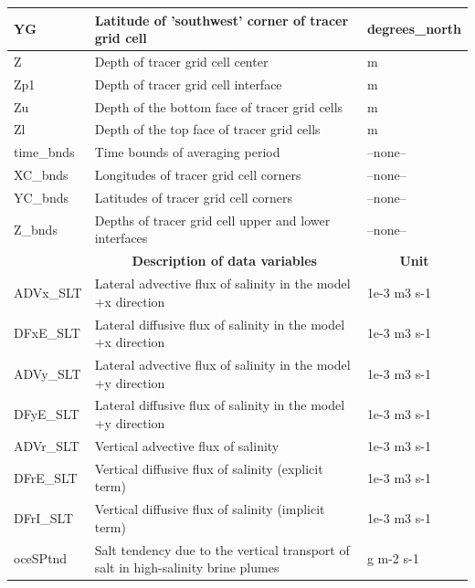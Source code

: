 \begin{longtable}{|m{}|m{}|m{}|}
YG &Latitude of 'southwest' corner of tracer grid cell &degrees\_north  \\ \hline
Z &Depth of tracer grid cell center &m  \\ \hline
Zp1 &Depth of tracer grid cell interface &m  \\ \hline
Zu &Depth of the bottom face of tracer grid cells &m  \\ \hline
Zl &Depth of the top face of tracer grid cells &m  \\ \hline
time\_bnds &Time bounds of averaging period &--none--  \\ \hline
XC\_bnds &Longitudes of tracer grid cell corners &--none--  \\ \hline
YC\_bnds &Latitudes of tracer grid cell corners &--none--  \\ \hline
Z\_bnds &Depths of tracer grid cell upper and lower interfaces &--none--  \\ \hline
\rowcolor{lightgray} \multicolumn{1}{|c|}{\textbf{Variables}} & \multicolumn{1}{|c|}{\textbf{Description of data variables}} &  \multicolumn{1}{|c|}{\textbf{Unit}}\\ \hline
ADVx\_SLT &Lateral advective flux of salinity in the model +x direction &1e-3 m3 s-1  \\ \hline
DFxE\_SLT &Lateral diffusive flux of salinity in the model +x direction &1e-3 m3 s-1  \\ \hline
ADVy\_SLT &Lateral advective flux of salinity in the model +y direction &1e-3 m3 s-1  \\ \hline
DFyE\_SLT &Lateral diffusive flux of salinity in the model +y direction &1e-3 m3 s-1  \\ \hline
ADVr\_SLT &Vertical advective flux of salinity &1e-3 m3 s-1  \\ \hline
DFrE\_SLT &Vertical diffusive flux of salinity (explicit term) &1e-3 m3 s-1  \\ \hline
DFrI\_SLT &Vertical diffusive flux of salinity (implicit term) &1e-3 m3 s-1  \\ \hline
oceSPtnd &Salt tendency due to the vertical transport of salt in high-salinity brine plumes &g m-2 s-1  \\ \hline
\end{longtable}

\newp
\pagebreak
